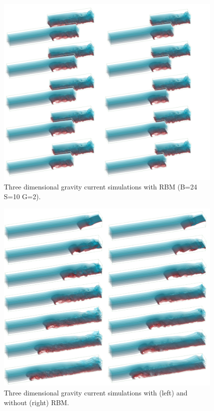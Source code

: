 \cp
\vspace{0.5in}
\begin{figure}[htbp]
\vspace{0.5in}
\hspace{0.0in}
\includegraphics[width=6.0in]{../figures/3D/RBM/B24-S10-G2/3D-RBM-B24-S10-G2.pdf}
    \caption{Three dimensional gravity current simulations with RBM (B=24 S=10 G=2).}
\label{fig:RBM-3D-action}
\end{figure}

\cp
\begin{figure}[htbp]
\vspace{0.5in}
\hspace{0.0in}
\includegraphics[width=6.0in]{../figures/3D/RBM/B24-S10-G2/Comparison-OneDomain-RBM.pdf}
    \caption{Three dimensional gravity current simulations with (left) and without (right) RBM.}
\label{fig:RBM-3D-comparison}
\end{figure}

